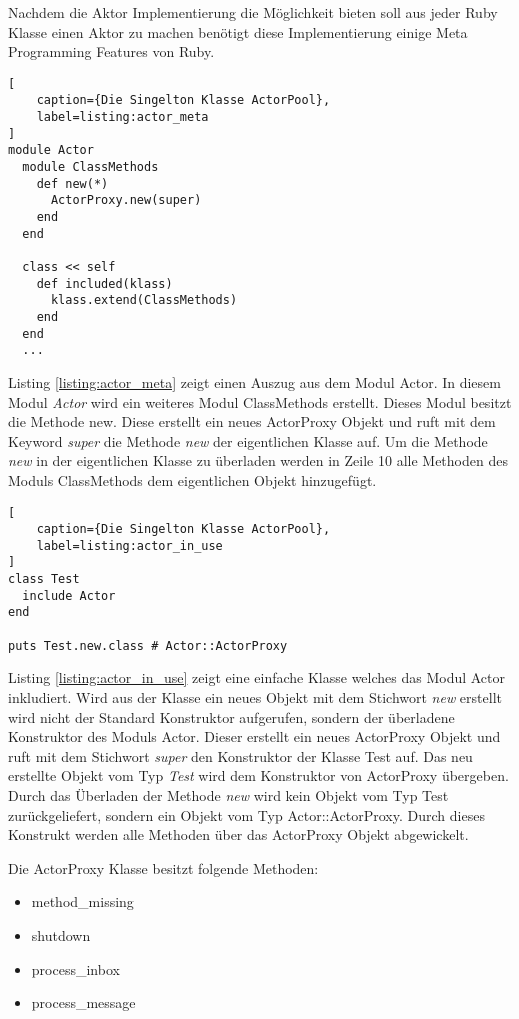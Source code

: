 Nachdem die Aktor Implementierung die Möglichkeit bieten soll aus jeder Ruby Klasse einen Aktor zu machen benötigt diese Implementierung einige Meta Programming Features von Ruby. 

\begin{lstlisting}[
	caption={Die Singelton Klasse ActorPool},
	label=listing:actor_meta
]
module Actor
  module ClassMethods
    def new(*)
      ActorProxy.new(super)
    end
  end

  class << self
    def included(klass)
      klass.extend(ClassMethods)
    end
  end
  ...
\end{lstlisting}


Listing \ref{listing:actor_meta} zeigt einen Auszug aus dem Modul Actor. In diesem Modul \emph{Actor} wird ein weiteres Modul ClassMethods erstellt. Dieses Modul besitzt die Methode new. Diese erstellt ein neues ActorProxy Objekt und ruft mit dem Keyword \emph{super} die Methode \emph{new} der eigentlichen Klasse auf. Um die Methode \emph{new} in der eigentlichen Klasse zu überladen werden in Zeile 10 alle Methoden des Moduls ClassMethods dem eigentlichen Objekt hinzugefügt. 

\begin{lstlisting}[
	caption={Die Singelton Klasse ActorPool},
	label=listing:actor_in_use
]
class Test
  include Actor
end

puts Test.new.class # Actor::ActorProxy
\end{lstlisting}

Listing \ref{listing:actor_in_use} zeigt eine einfache Klasse welches das Modul Actor inkludiert.  Wird aus der Klasse ein neues Objekt mit dem Stichwort \emph{new} erstellt wird nicht der Standard Konstruktor aufgerufen, sondern der überladene Konstruktor des Moduls Actor. Dieser erstellt ein neues ActorProxy Objekt und ruft mit dem Stichwort \emph{super} den Konstruktor der Klasse Test auf. Das neu erstellte Objekt vom Typ \emph{Test} wird dem Konstruktor von ActorProxy übergeben. Durch das Überladen der Methode \emph{new} wird kein Objekt vom Typ Test zurückgeliefert, sondern ein Objekt vom Typ Actor::ActorProxy. Durch dieses Konstrukt 
werden alle Methoden über das ActorProxy Objekt abgewickelt.

Die ActorProxy Klasse besitzt folgende Methoden:

\begin{itemize}
  \item method\_missing
  \item shutdown
  \item process\_inbox
  \item process\_message
\end{itemize}

